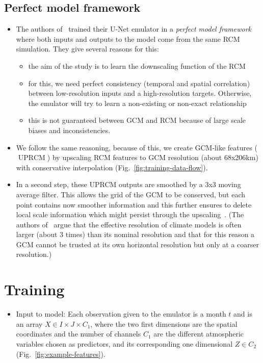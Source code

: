 \documentclass[a4paper,11pt,oneside]{report}
\begin{document}
\subsection{Perfect model framework}
\begin{itemize}
    \item The authors of~\cite{Kittel} trained their U-Net emulator in a \textit{perfect model framework} where both inputs and outputs to the model come from the same RCM simulation. They give several reasons for this: 
    \begin{itemize}
        \item the aim of the study is to learn the downscaling function of the RCM
        \item for this, we need perfect consistency (temporal and spatial correlation) between low-resolution inputs and a high-resolution targets. Otherwise, the emulator will try to learn a non-existing or non-exact relationship
        \item this is not guaranteed between GCM and RCM because of large scale biases and inconsistencies. 
    \end{itemize}
    \item We follow the same reasoning, because of this, we create GCM-like features ($\operatorname{UPRCM}$) by upscaling RCM features to GCM resolution (about 68x206km) with conservative interpolation (Fig.~\ref{fig:training-data-flow}). 
    \item In a second step, these UPRCM outputs are smoothed by a 3x3 moving average filter. This allows the grid of the GCM to be conserved, but each point contains now smoother information and this further ensures to delete local scale information which might persist through the upscaling~\cite{Doury, Klaver2020}. (The authors of~\cite{Doury, Klaver2020} argue that the effective resolution of climate models is often larger (about 3 times) than its nominal resolution and that for this reason a GCM cannot be trusted at its own horizontal resolution but only at a coarser resolution.)
\end{itemize}

\section{Training}\label{subsec:training}
\begin{itemize}
    \item Input to model: Each observation given to the emulator is a month $t$ and is an array $X \in I \times J \times C_1$, where the two first dimensions are the spatial coordinates and the number of channels $C_1$ are the different atmospheric variables chosen as predictors, and its corresponding one dimensional $Z \in C_2$ (Fig.~\ref{fig:example-features}).
\end{itemize}
\end{document}
